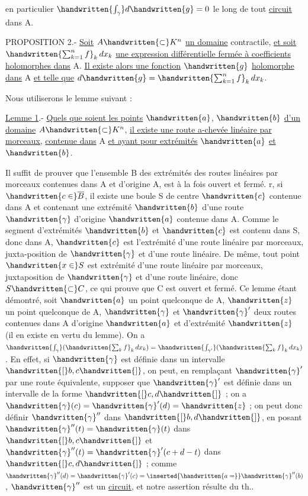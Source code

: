 
en particulier $\handwritten{\int_\gamma}d\handwritten{g}=0$ le long de tout \uline{circuit} dans A.

PROPOSITION 2.- \uline{Soit} $A\handwritten{\subset}K^n$ \uline{un domaine} contractile, \uline{et soit} $\handwritten{\sum_{k=1}^n f}_k\,dx_k$ \uline{une expression différentielle fermée à coefficients holomorphes dans} A. \uline{Il existe alors une fonction} $\handwritten{g}$ \uline{holomorphe dans} A \uline{et telle que} $d\handwritten{g}=\handwritten{\sum_{k=1}^n f}_k\,dx_k$.

Nous utiliserons le lemme suivant :

\uline{Lemme 1}.- \uline{Quels que soient les points} $\handwritten{a}$, $\handwritten{b}$ \uline{d'un domaine} $A\handwritten{\subset}K^n$, \uline{il existe une route a-chevée linéaire par morceaux}, \uline{contenue dans} A \uline{et ayant pour extrémités} $\handwritten{a}$ \uline{et} $\handwritten{b}$.

Il suffit de prouver que l'ensemble B des extrémités des routes linéaires par morceaux contenues dans A et d'origine A, est à la fois ouvert et fermé. r, si $\handwritten{c\in}\overline{B}$, il existe une boule S de centre $\handwritten{c}$ contenue dans A et contenant une extrémité $\handwritten{b}$ d'une route $\handwritten{\gamma}$ d'origine $\handwritten{a}$ contenue dans A. Comme le segment d'extrémités $\handwritten{b}$ et $\handwritten{c}$ est contenu dans S, donc dans A, $\handwritten{c}$ est l'extrémité d'une route linéaire par morceaux, juxta-position de $\handwritten{\gamma}$ et d'une route linéaire. De même, tout point $\handwritten{x\in}S$ est extrémité d'une route linéaire par morceaux, juxtaposition de $\handwritten{\gamma}$ et d'une route linéaire, donc $S\handwritten{\subset}C$, ce qui prouve que C est ouvert et fermé. Ce lemme étant démontré, soit $\handwritten{a}$ un point quelconque de A, $\handwritten{z}$ un point quelconque de A, $\handwritten{\gamma}$ et $\handwritten{\gamma}'$ deux routes contenues dans A d'origine $\handwritten{a}$ et d'extrémité $\handwritten{z}$ (il en existe en vertu du lemme). On a $\handwritten{\int_\gamma}(\handwritten{\sum_k f}_k\,dx_k)=\handwritten{\int_{\gamma'}}(\handwritten{\sum_k f}_k\,dx_k)$. En effet, si $\handwritten{\gamma}$ est définie dans un intervalle $\handwritten{[}b,c\handwritten{]}$, on peut, en remplaçant $\handwritten{\gamma}'$ par une route équivalente, supposer que $\handwritten{\gamma}'$ est définie dans un intervalle de la forme $\handwritten{[}c,d\handwritten{]}$ ; on a $\handwritten{\gamma}(c)=\handwritten{\gamma}'(d)=\handwritten{z}$ ; on peut donc définir $\handwritten{\gamma}''$ dans $\handwritten{[}b,d\handwritten{]}$, en posant $\handwritten{\gamma}''(t)=\handwritten{\gamma}(t)$ dans $\handwritten{[}b,c\handwritten{]}$ et $\handwritten{\gamma}''(t)=\handwritten{\gamma}'(c+d-t)$ dans $\handwritten{[}c,d\handwritten{]}$ ; comme $\handwritten{\gamma}''(d)=\handwritten{\gamma}'(c)=\inserted{\handwritten{a=}}\handwritten{\gamma}''(b)$, $\handwritten{\gamma}''$ est un \uline{circuit}, et notre assertion résulte du th..
